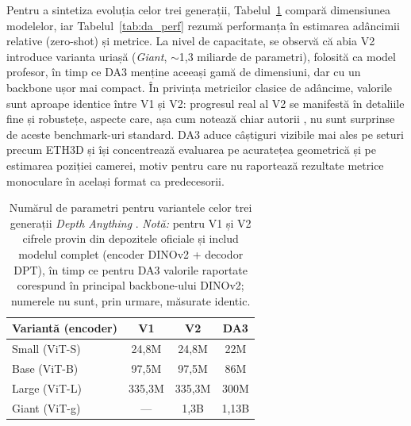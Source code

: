 \par Pentru a sintetiza evoluția celor trei generații, Tabelul~\ref{tab:da_params} compară dimensiunea modelelor, iar Tabelul~\ref{tab:da_perf} rezumă performanța în estimarea adâncimii relative (zero-shot) și metrice. La nivel de capacitate, se observă că abia V2 introduce varianta uriașă (\emph{Giant}, $\sim$1,3 miliarde de parametri), folosită ca model profesor, în timp ce DA3 menține aceeași gamă de dimensiuni, dar cu un backbone ușor mai compact. În privința metricilor clasice de adâncime, valorile sunt aproape identice între V1 și V2: progresul real al V2 se manifestă în detaliile fine și robustețe, aspecte care, așa cum notează chiar autorii \cite{yang2024depth}, nu sunt surprinse de aceste benchmark-uri standard. DA3 \cite{depthanything3} aduce câștiguri vizibile mai ales pe seturi precum ETH3D și își concentrează evaluarea pe acuratețea geometrică și pe estimarea poziției camerei, motiv pentru care nu raportează rezultate metrice monoculare în același format ca predecesorii.

\begin{table}[htbp]
    \centering
    \begin{tabular}{lccc}
        \toprule
        Variantă (encoder) & V1 & V2 & DA3 \\
        \midrule
        Small (ViT-S) & 24,8M & 24,8M & 22M \\
        Base (ViT-B)  & 97,5M & 97,5M & 86M \\
        Large (ViT-L) & 335,3M & 335,3M & 300M \\
        Giant (ViT-g) & --- & 1,3B & 1,13B \\
        \bottomrule
    \end{tabular}
    \caption{Numărul de parametri pentru variantele celor trei generații \emph{Depth Anything} \cite{yang2024depthv1, yang2024depth, depthanything3}. \emph{Notă:} pentru V1 și V2 cifrele provin din depozitele oficiale și includ modelul complet (encoder DINOv2 + decodor DPT), în timp ce pentru DA3 valorile raportate corespund în principal backbone-ului DINOv2; numerele nu sunt, prin urmare, măsurate identic.}
    \label{tab:da_params}
\end{table}

